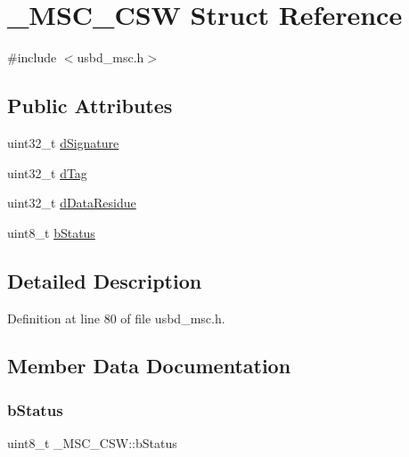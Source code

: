 \hypertarget{struct___m_s_c___c_s_w}{}\section{\+\_\+\+M\+S\+C\+\_\+\+C\+SW Struct Reference}
\label{struct___m_s_c___c_s_w}


{\ttfamily \#include $<$usbd\+\_\+msc.\+h$>$}

\subsection*{Public Attributes}
\begin{DoxyCompactItemize}
\item 
uint32\+\_\+t \hyperlink{struct___m_s_c___c_s_w_ab5e9fc6fcc75f4b6e5ca7aada1443913}{d\+Signature}
\item 
uint32\+\_\+t \hyperlink{struct___m_s_c___c_s_w_a6b340e8049b2f6b06d3747b42db1ebac}{d\+Tag}
\item 
uint32\+\_\+t \hyperlink{struct___m_s_c___c_s_w_a58a9d983a1e1707b9a99ad1a61acae72}{d\+Data\+Residue}
\item 
uint8\+\_\+t \hyperlink{struct___m_s_c___c_s_w_a6dc520801824afdf286135b22366cbbe}{b\+Status}
\end{DoxyCompactItemize}


\subsection{Detailed Description}


Definition at line 80 of file usbd\+\_\+msc.\+h.



\subsection{Member Data Documentation}
\mbox{\label{struct___m_s_c___c_s_w_a6dc520801824afdf286135b22366cbbe}} 
\subsubsection{\texorpdfstring{b\+Status}{bStatus}}
{\footnotesize\ttfamily uint8\+\_\+t \+\_\+\+M\+S\+C\+\_\+\+C\+S\+W\+::b\+Status}




